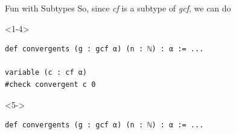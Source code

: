 \documentclass{beamer}
\begin{document}
\begin{frame}[fragile]{Fun with Subtypes}
So, since \emph{cf} is a subtype of \emph{gcf}, we can do
\begin{onlyenv}<1-4>
\begin{verbatim}
def convergents (g : gcf α) (n : ℕ) : α := ...

variable (c : cf α)
#check convergent c 0
\end{verbatim}
\end{onlyenv}
\begin{onlyenv}<5->
\begin{verbatim}
def convergents (g : gcf α) (n : ℕ) : α := ...


\end{verbatim}
\end{onlyenv}
\end{frame}
\end{document}
